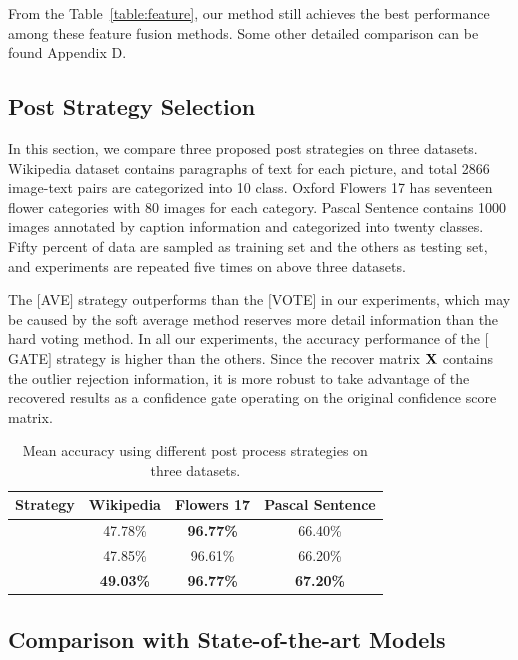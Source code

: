 \documentclass[letterpaper]{article} %
\def\bX{{\bf X}}
\def\bX{{\bf X}}
\begin{document}
From the Table~\ref{table:feature}, our method still achieves the best performance among these feature fusion methods.
Some other detailed comparison can be found Appendix D.


\subsection{Post Strategy Selection}

In this section, we compare three proposed post strategies on three datasets.
Wikipedia dataset \cite{rasiwasia2010new} contains paragraphs of text for each picture, and total 2866 image-text pairs are categorized into 10 class.
Oxford Flowers 17 \cite{nilsback2006visual} has seventeen flower categories with 80 images for each category.
Pascal Sentence \cite{Li2006One} contains 1000 images annotated by caption information and categorized into twenty classes.
Fifty percent of data are sampled as training set and the others as testing set, and experiments are repeated five times on above three datasets.

The $[$AVE$]$ strategy outperforms than the $[$VOTE$]$ in our experiments, which may be caused by the soft average method reserves more detail information than the hard voting method.
In all our experiments, the accuracy performance of the $[$GATE$]$ strategy is higher than the others.
Since the recover matrix $\bX$ contains the outlier rejection information,
it is more robust to take advantage of the recovered results as a confidence gate operating on the original confidence score matrix.

\begin{table}[ht]
\centering
\begin{tabular}{|c|c|c|c|}
\hline
Strategy            & Wikipedia         & Flowers 17          & Pascal Sentence     \\\hline
[AVE]               & 47.78\%           & \textbf{96.77\%}    & 66.40\%             \\\hline
[VOTE]              & 47.85\%           & 96.61\%             & 66.20\%             \\\hline
[GATE]              & \textbf{49.03\%}  & \textbf{96.77\%}    & \textbf{67.20\%}    \\
\hline
\end{tabular}
\caption{Mean accuracy using different post process strategies on three datasets.}
\label{table:strategy}
\end{table}

\subsection{Comparison with State-of-the-art Models}
\end{document}
